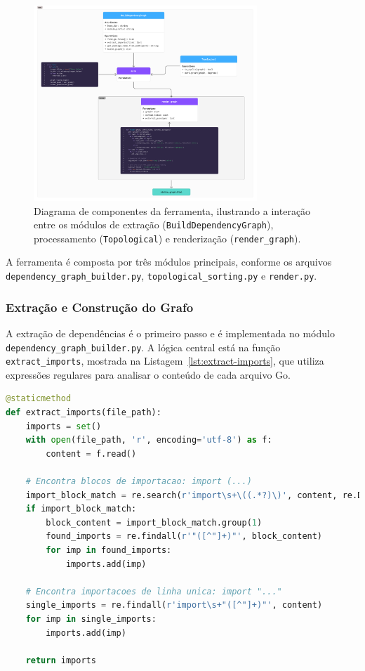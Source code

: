 \documentclass[12pt]{article}
\begin{document}
\begin{figure}[htbp]
    \centering
    \includegraphics[width=0.75\textwidth]{images/diagrama_classes.png}
    \caption{Diagrama de componentes da ferramenta, ilustrando a interação entre os módulos de extração (\texttt{BuildDependencyGraph}), processamento (\texttt{Topological}) e renderização (\texttt{render\_graph}).}
    \label{fig:diagrama-classes}
\end{figure}

\FloatBarrier


A ferramenta é composta por três módulos principais, conforme os arquivos \texttt{dependency\_graph\_builder.py}, \texttt{topological\_sorting.py} e \texttt{render.py}.

\subsubsection{Extração e Construção do Grafo}
A extração de dependências é o primeiro passo e é implementada no módulo \texttt{dependency\_graph\_builder.py}. A lógica central está na função \texttt{extract\_imports}, mostrada na Listagem~\ref{lst:extract-imports}, que utiliza expressões regulares para analisar o conteúdo de cada arquivo Go.

\begin{lstlisting}[language=Python, caption={Trecho do código de extração de importações.}, label={lst:extract-imports}]
@staticmethod
def extract_imports(file_path):
    imports = set()
    with open(file_path, 'r', encoding='utf-8') as f:
        content = f.read()

    # Encontra blocos de importacao: import (...)
    import_block_match = re.search(r'import\s+\((.*?)\)', content, re.DOTALL)
    if import_block_match:
        block_content = import_block_match.group(1)
        found_imports = re.findall(r'"([^"]+)"', block_content)
        for imp in found_imports:
            imports.add(imp)

    # Encontra importacoes de linha unica: import "..."
    single_imports = re.findall(r'import\s+"([^"]+)"', content)
    for imp in single_imports:
        imports.add(imp)

    return imports
\end{lstlisting}
\end{document}
